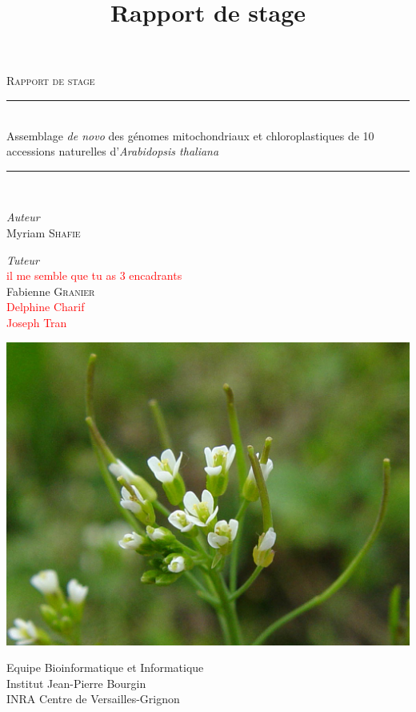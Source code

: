 \documentclass[a4paper]{article}
\title{Rapport de stage}
\newcommand{\mynotes}[1]{\textcolor{red}{#1}}
\newcommand{\HRule}{\rule{\linewidth}{0.5mm}}
\begin{document}
\begin{titlepage}

\begin{center}

\thispagestyle{plain}

{ \Huge \textsc{Rapport de stage}\  \\[0.4cm] }
\HRule \\[0.4cm]
{ \Large Assemblage \textit{de novo} des génomes mitochondriaux et chloroplastiques de 10 accessions naturelles d'\textit{Arabidopsis thaliana}  \\[0.4cm] }
\HRule \\[0.4cm]

\vspace{1.5cm}

\begin{minipage}{0.4\textwidth}
\begin{flushleft} \large
\emph{Auteur}\\
Myriam \textsc{Shafie}
\end{flushleft}
\end{minipage}
\begin{minipage}{0.4\textwidth}
\begin{flushright} \large
	\emph{Tuteur} \\
	\mynotes{il me semble que tu as 3 encadrants} \\
	Fabienne \textsc{Granier} \\
	\mynotes{Delphine Charif} \\
	\mynotes{Joseph Tran}
\end{flushright}
\end{minipage}

\vspace{2cm}

\includegraphics[scale=0.2]{Titre/a_thaliana.jpg}

\vspace{1cm}

Equipe Bioinformatique et Informatique \\[0.2cm]
Institut Jean-Pierre Bourgin \\[0.2cm]
INRA Centre de Versailles-Grignon


\end{center}

\end{titlepage}
\end{document}

